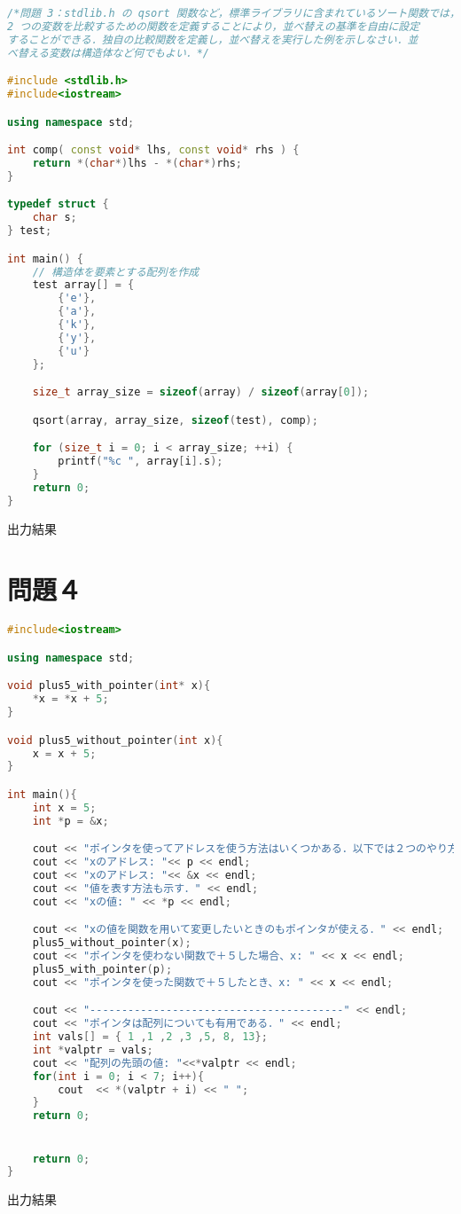 \documentclass[fleqn, a4paper. 12pt]{ltjsarticle} %
\begin{document}
\begin{lstlisting}[language = C++]
    /*問題 3：stdlib.h の qsort 関数など，標準ライブラリに含まれているソート関数では，
2 つの変数を比較するための関数を定義することにより，並べ替えの基準を自由に設定
することができる．独自の比較関数を定義し，並べ替えを実行した例を示しなさい．並
べ替える変数は構造体など何でもよい．*/

#include <stdlib.h>
#include<iostream>

using namespace std;

int comp( const void* lhs, const void* rhs ) {
    return *(char*)lhs - *(char*)rhs;
}

typedef struct {
    char s;
} test;

int main() {
    // 構造体を要素とする配列を作成
    test array[] = {
        {'e'},
        {'a'},
        {'k'},
        {'y'},
        {'u'}
    };

    size_t array_size = sizeof(array) / sizeof(array[0]);

    qsort(array, array_size, sizeof(test), comp);

    for (size_t i = 0; i < array_size; ++i) {
        printf("%c ", array[i].s);
    }
    return 0;
}
\end{lstlisting}
出力結果


\section{問題４}

\begin{lstlisting}[language = C++]
    #include<iostream>

using namespace std;

void plus5_with_pointer(int* x){
    *x = *x + 5;
}

void plus5_without_pointer(int x){
    x = x + 5;
}

int main(){
    int x = 5;
    int *p = &x;

    cout << "ポインタを使ってアドレスを使う方法はいくつかある．以下では２つのやり方を示す．" << endl;
    cout << "xのアドレス: "<< p << endl;
    cout << "xのアドレス: "<< &x << endl;
    cout << "値を表す方法も示す．" << endl;
    cout << "xの値: " << *p << endl;

    cout << "xの値を関数を用いて変更したいときのもポインタが使える．" << endl;
    plus5_without_pointer(x);
    cout << "ポインタを使わない関数で＋５した場合、x: " << x << endl;
    plus5_with_pointer(p);
    cout << "ポインタを使った関数で＋５したとき、x: " << x << endl;

    cout << "----------------------------------------" << endl;
    cout << "ポインタは配列についても有用である．" << endl;
    int vals[] = { 1 ,1 ,2 ,3 ,5, 8, 13};
    int *valptr = vals;
    cout << "配列の先頭の値: "<<*valptr << endl;
    for(int i = 0; i < 7; i++){
        cout  << *(valptr + i) << " ";
    }
    return 0;


    return 0;
}
\end{lstlisting}
出力結果

\end{document}
